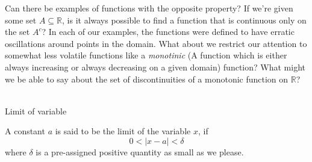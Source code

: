 \documentclass[12pt]{article}
\begin{document}
\quad Can there be examples of functions with the opposite property? If we're given some set $A \subseteq \mathbb{R}$, is it always possible to find a function that is continuous only on the set $A^c$? In each of our examples, the functions were defined to have erratic oscillations around points in the domain. What about we restrict our attention to somewhat less volatile functions like a \textit{monotinic} (A function which is either always increasing or always decreasing on a given domain) function? What might we be able to say about the set of discontinuities of a monotonic function on $\mathbb{R}$? \\~\\

\begin{center}
\end{center}

\begin{definition*}{Limit of variable}

    A constant $a$ is said to be the limit of the variable $x$, if \[
        0 < |x-a| < \delta
    \] where $\delta$ is a pre-assigned positive quantity as small as we please.
\end{definition*}


\end{document}
